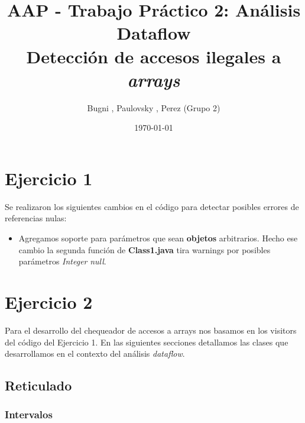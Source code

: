 \documentclass[a4paper]{article}
\begin{document}
\title{AAP - Trabajo Práctico 2: Análisis Dataflow \\ Detección de accesos ilegales a \emph{arrays}}
\date{\today}

\author{Bugni , Paulovsky , Perez (Grupo 2)}

\maketitle

\section{Ejercicio 1}

Se realizaron los siguientes cambios en el código para detectar posibles errores de referencias nulas:

\begin{itemize}
\item Agregamos soporte para parámetros que sean \textbf{objetos} arbitrarios. Hecho ese cambio la segunda función de \textbf{Class1.java} tira warnings por posibles parámetros \emph{Integer} \textit{null}.
\end{itemize}

\section{Ejercicio 2}

Para el desarrollo del chequeador de accesos a arrays nos basamos en los visitors del código del Ejercicio 1.
En las siguientes secciones detallamos las clases que desarrollamos en el contexto del análisis \emph{dataflow}.

\subsection{Reticulado}

\subsubsection{Intervalos}
\end{document}
